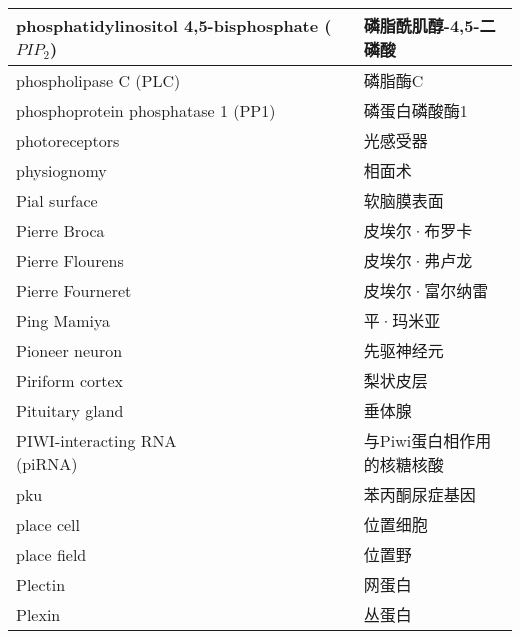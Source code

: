 \begin{longtable}{lll}
	\midrule
	\makecell[l]{phosphatidylinositol \\ 4,5-bisphosphate ($ PIP_2 $)}    && 磷脂酰肌醇-4,5-二磷酸   \\
	
	\midrule
	phospholipase C (PLC)     && 磷脂酶C   \\
	
	\midrule
	phosphoprotein phosphatase 1 (PP1)     && 磷蛋白磷酸酶1   \\
	
	\midrule
	photoreceptors     && 光感受器   \\
	
	\midrule
	physiognomy     && 相面术   \\
	
	\midrule
	Pial surface     && 软脑膜表面   \\
	
	\midrule
	Pierre Broca     && 皮埃尔·布罗卡   \\
	
	\midrule
	Pierre Flourens     && 皮埃尔·弗卢龙   \\
	
	\midrule
	Pierre Fourneret     && 皮埃尔·富尔纳雷   \\
	
	\midrule
	Ping Mamiya     && 平·玛米亚   \\
	
	\midrule
	Pioneer neuron     && 先驱神经元   \\
	
	\midrule
	Piriform cortex     && 梨状皮层   \\
	
	\midrule
	Pituitary gland     && 垂体腺   \\
	
	\midrule
	\makecell[l]{PIWI-interacting RNA \\ (piRNA) }  && \makecell[l]{与Piwi蛋白相作用\\的核糖核酸}   \\
	
	\midrule
	pku   && 苯丙酮尿症基因   \\
	
	\midrule
	place cell   && 位置细胞   \\
	
	\midrule
	place field   && 位置野   \\
	
	\midrule
	Plectin   && 网蛋白   \\
	
	\midrule
	Plexin   && 丛蛋白   \\
	

\end{longtable}
